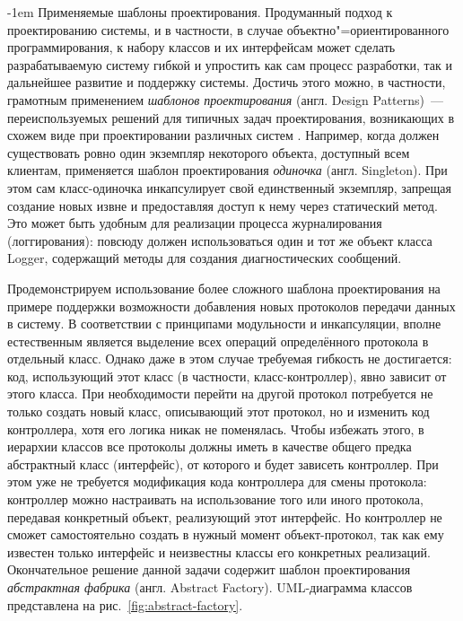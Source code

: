\documentclass[a4paper, 14pt, titlepage]{extarticle}
\makeatletter
\newcommand{\eng}[1]{\foreignlanguage{english}{#1}}
\newcommand{\term}[1]{\emph{#1}}
\renewcommand{\paragraph}{%
    \@startsection{paragraph}{4}%
    {\parindent}{\z@}{-1em}%
    {\normalfont\normalsize\bfseries}%
  }
\makeatother
\begin{document}
  \paragraph{Применяемые шаблоны проектирования.}
  Продуманный подход к проектированию системы, и в частности, в случае объектно"=ориентированного
  программирования, к набору классов и их интерфейсам может сделать разрабатываемую систему гибкой и
  упростить как сам процесс разработки, так и дальнейшее развитие и поддержку системы. Достичь этого
  можно, в частности, грамотным применением \term{шаблонов проектирования} (англ. \eng{Design
  Patterns})~--- переиспользуемых решений для типичных задач проектирования, возникающих в схожем
  виде при проектировании различных систем \cite{gamma-patterns}. Например, когда должен
  существовать ровно один экземпляр некоторого объекта, доступный всем клиентам, применяется шаблон
  проектирования \term{одиночка} (англ. \eng{Singleton}). При этом сам класс-одиночка инкапсулирует
  свой единственный экземпляр, запрещая создание новых извне и предоставляя доступ к нему через
  статический метод. Это может быть удобным для реализации процесса журналирования (логгирования):
  повсюду должен использоваться один и тот же объект класса \eng{Logger}, содержащий методы для
  создания диагностических сообщений.

  Продемонстрируем использование более сложного шаблона проектирования на примере поддержки
  возможности добавления новых протоколов передачи данных в систему.
  В соответствии с принципами модульности и инкапсуляции, вполне естественным является выделение всех
  операций определённого протокола в отдельный класс. Однако даже в этом случае требуемая гибкость
  не достигается: код, использующий этот класс (в частности, класс-контроллер), явно зависит от
  этого класса. При необходимости перейти на другой протокол потребуется не только создать новый
  класс, описывающий этот протокол, но и изменить код контроллера, хотя его логика никак не
  поменялась. Чтобы избежать этого, в иерархии классов все протоколы должны иметь в качестве общего
  предка абстрактный класс (интерфейс), от которого и будет зависеть контроллер. При этом уже не
  требуется модификация кода контроллера для смены протокола: контроллер можно настраивать на
  использование того или иного протокола, передавая конкретный объект, реализующий этот интерфейс.
  Но контроллер не сможет самостоятельно создать в нужный момент объект-протокол, так как ему
  известен только интерфейс и неизвестны классы его конкретных реализаций.
  Окончательное решение данной задачи содержит шаблон проектирования \term{абстрактная фабрика}
  (англ. \eng{Abstract Factory}). UML-диаграмма классов представлена на рис.~\ref{fig:abstract-factory}.
\end{document}

